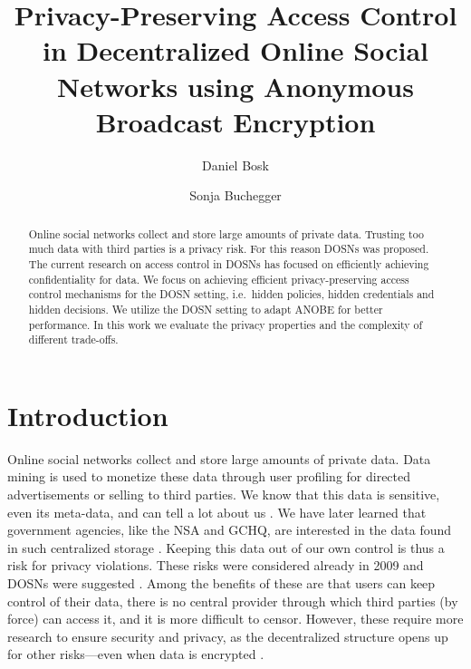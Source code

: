 \title{%
  Privacy-Preserving Access Control in
  Decentralized Online Social Networks using
  Anonymous Broadcast Encryption
}
\author{%
  Daniel Bosk \and
  Sonja Buchegger
}

\maketitle
\begin{abstract}
  Online social networks collect and store large amounts of private data.
  Trusting too much data with third parties is a privacy risk.
  For this reason \acp{DOSN} was proposed.
  The current research on access control in \acp{DOSN} has focused on 
  efficiently achieving confidentiality for data.
  We focus on achieving efficient privacy-preserving access control mechanisms 
  for the \ac{DOSN} setting, i.e.~hidden policies, hidden credentials and 
  hidden decisions.
  We utilize the \ac{DOSN} setting to adapt \ac{ANOBE} for better performance.
  In this work we evaluate the privacy properties and the complexity of 
  different trade-offs.

\end{abstract}

\acresetall
\section{Introduction}

Online social networks collect and store large amounts of private data.
Data mining is used to monetize these data through user profiling for directed 
advertisements or selling to third parties.
We know that this data is sensitive, even its meta-data, and can tell a lot 
about us \cite[e.g.][]{pregnancy}.
We have later learned that government agencies, like the \ac{NSA} and 
\ac{GCHQ}, are interested in the data found in such centralized storage 
\cite{prism}.
Keeping this data out of our own control is thus a risk for privacy violations.
These risks were considered already in 2009 and \acp{DOSN} were suggested 
\cite[e.g.][]{peerson}.
Among the benefits of these are that users can keep control of their data, 
there is no central provider through which third parties (by force) can access 
it, and it is more difficult to censor.
However, these require more research to ensure security and privacy, as the 
decentralized structure opens up for other risks---even when data is encrypted 
\cite{metadata}.


